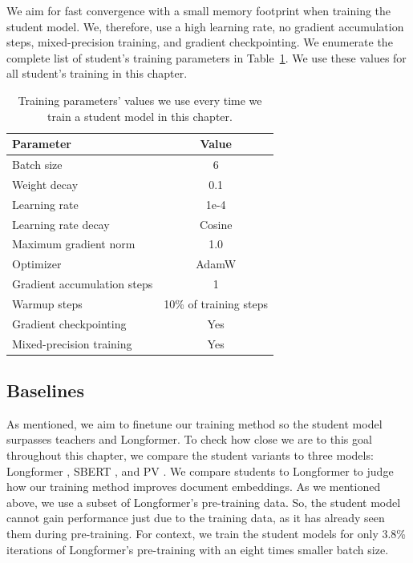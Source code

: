 We aim for fast convergence with a small memory footprint when training the
student model. We, therefore, use a high learning rate, no gradient
accumulation steps, mixed-precision training, and gradient checkpointing. We
enumerate the complete list of student's training parameters in
Table~\ref{table:student_train_params}. We use these values for all student's
training in this chapter.


\begin{table}
  \centering
  \footnotesize

  \begin{tabular}{l c}
    \toprule
    Parameter & Value \\
    \midrule
    Batch size & 6 \\
    Weight decay & 0.1 \\
    Learning rate & 1e-4 \\
    Learning rate decay & Cosine \\
    Maximum gradient norm & 1.0 \\
    Optimizer & AdamW \\
    Gradient accumulation steps & 1 \\
    Warmup steps & 10\% of training steps \\
    Gradient checkpointing & Yes \\
    Mixed-precision training & Yes \\
    \bottomrule
  \end{tabular}

  \caption{Training parameters' values we use every time we train a student model in this chapter.}

  \label{table:student_train_params}

\end{table}

\subsection{Baselines}

As mentioned, we aim to finetune our training method so the student model
surpasses teachers and Longformer. To check how close we are to this goal
throughout this chapter, we compare the student variants to three models:
Longformer \citep{beltagy2020longformer}, SBERT \citep{reimers2019sentence},
and PV \citep{le2014distributed}. We compare students to Longformer to judge
how our training method improves document embeddings. As we mentioned above, we
use a subset of Longformer's pre-training data. So, the student model cannot
gain performance just due to the training data, as it has already seen them
during pre-training. For context, we train the student models for only 3.8\%
iterations of Longformer's pre-training with an eight times smaller batch size.

